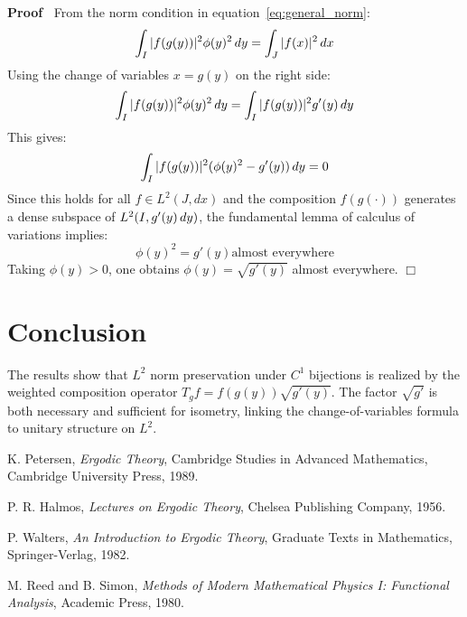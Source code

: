 \documentclass{article}
\newcommand{\tmem}[1]{{\em #1\/}}
\newenvironment{proof}{\noindent\textbf{Proof\ }}{\hspace*{\fill}$\Box$\medskip}
\begin{document}
\begin{proof}
  From the norm condition in equation~\eqref{eq:general_norm}:
  \begin{equation}
    \label{eq:phi_condition} \int_I |f (g (y)) |^2 \phi (y)^2  \hspace{0.17em}
    dy = \int_J |f (x) |^2  \hspace{0.17em} dx
  \end{equation}
  Using the change of variables $x = g (y)$ on the right side:
  \begin{equation}
    \label{eq:phi_comparison} \int_I |f (g (y)) |^2 \phi (y)^2 
    \hspace{0.17em} dy = \int_I |f (g (y)) |^2 g' (y)  \hspace{0.17em} dy
  \end{equation}
  This gives:
  \begin{equation}
    \label{eq:phi_difference} \int_I |f (g (y)) |^2  (\phi (y)^2 - g' (y)) 
    \hspace{0.17em} dy = 0
  \end{equation}
  Since this holds for all $f \in L^2 (J, dx)$ and the composition $f (g
  (\cdot))$ generates a dense subspace of $L^2 (I, g' (y) \hspace{0.17em}
  dy)$, the fundamental lemma of calculus of variations implies:
  \begin{equation}
    \label{eq:phi_ae_equal} \phi (y)^2 = g' (y) \text{almost everywhere}
  \end{equation}
  Taking $\phi (y) > 0$, one obtains $\phi (y) = \sqrt{g' (y)}$ almost
  everywhere.
\end{proof}

\section{Conclusion}

The results show that $L^2$ norm preservation under $C^1$ bijections is
realized by the weighted composition operator $T_g f = f (g (y)) \sqrt{g'
(y)}$. The factor $\sqrt{g'}$ is both necessary and sufficient for isometry,
linking the change-of-variables formula to unitary structure on $L^2$.

\begin{thebibliography}{9}
  {}K. Petersen, {\tmem{Ergodic Theory}},
  Cambridge Studies in Advanced Mathematics, Cambridge University Press, 1989.
  
  {}P. R. Halmos, {\tmem{Lectures on Ergodic
  Theory}}, Chelsea Publishing Company, 1956.
  
  {}P. Walters, {\tmem{An Introduction to
  Ergodic Theory}}, Graduate Texts in Mathematics, Springer-Verlag, 1982.
  
  {}M. Reed and B. Simon, {\tmem{Methods of Modern
  Mathematical Physics I: Functional Analysis}}, Academic Press, 1980.
\end{thebibliography}
\end{document}
